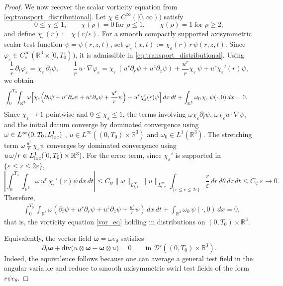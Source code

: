 \documentclass[reqno,11pt]{amsart}
\renewcommand{\div}{\mathrm{div}}
\begin{document}
\begin{proof}
We now recover the scalar vorticity equation from \eqref{eq:transport_distributional}.
Let $\chi\in C^\infty([0,\infty))$ satisfy
\[
0\le \chi\le 1,\qquad
\chi(\rho)=0\ \text{for }\rho\le 1,\qquad
\chi(\rho)=1\ \text{for }\rho\ge 2,
\]
and define $\chi_\varepsilon(r):=\chi(r/\varepsilon)$.
For a smooth compactly supported axisymmetric scalar test function
$\psi=\psi(r,z,t)$, set
$ \varphi_\varepsilon(x,t):=\chi_\varepsilon(r)\,r\,\psi(r,z,t).$
Since $\varphi_\varepsilon\in C_c^\infty(\mathbb R^3\times[0,T_0))$, it is admissible in
\eqref{eq:transport_distributional}. Using
\[
\frac1r\,\partial_t \varphi_\varepsilon=\chi_\varepsilon\,\partial_t\psi,
\qquad
\frac1r\,u\cdot\nabla \varphi_\varepsilon
=
\chi_\varepsilon\,(u^r\partial_r\psi+u^z\partial_z\psi)
+\frac{u^r}{r}\chi_\varepsilon\,\psi
+u^r\chi_\varepsilon'(r)\psi,
\]
we obtain
\begin{align*}
&\int_0^{T_0}\!\!\int_{\mathbb R^3}
\omega
\Bigl[
\chi_\varepsilon\Bigl(\partial_t\psi
+u^r\partial_r\psi
+u^z\partial_z\psi
+\frac{u^r}{r}\psi\Bigr)
+u^r\chi_\varepsilon'(r)\psi
\Bigr]\,dx\,dt
+\int_{\mathbb R^3}\omega_0\,\chi_\varepsilon\,\psi(\cdot,0)\,dx
=0.
\end{align*}
Since $\chi_\varepsilon\to 1$ pointwise and $0\le \chi_\varepsilon\le 1$,
the terms involving \(\omega\chi_\varepsilon\partial_t\psi\),
\(\omega\chi_\varepsilon u\cdot\nabla\psi\), and the initial datum converge by
dominated convergence using \(\omega\in L^\infty(0,T_0;L^1_{\rm loc})\) ,
\(u\in L^\infty((0,T_0)\times\mathbb R^3)\) and $\omega_0\in L^1(\mathbb{R}^3)$. The stretching term
$\omega\,\frac{u^r}{r}\,\chi_\varepsilon\psi$ 
converges by dominated convergence using
\(u\,\omega/r\in L^1_{\rm loc}([0,T_0)\times\mathbb R^3)\).
For the error term, since $\chi_\varepsilon'$ is supported in $\{\varepsilon\le r\le 2\varepsilon\}$,
\[
\left|
\int_0^{T_0}\!\!\int_{\mathbb R^3}\omega\,u^r\,\chi_\varepsilon'(r)\psi\,dx\,dt
\right|
\le C_{\psi}\|\omega\|_{L^\infty_{t,x}}\|u\|_{L^\infty_{t,x}}
\int_{\{\varepsilon\le r\le 2\varepsilon\}} \frac{r}{\varepsilon}\,dr\,d\theta\,dz\,dt
\le C_\psi \, \varepsilon\to 0.
\]
Therefore,
\begin{align*}
&\int_0^{T_0}\!\!\int_{\mathbb R^3}
\omega
\left(
\partial_t\psi
+u^r\partial_r\psi
+u^z\partial_z\psi
+\frac{u^r}{r}\psi
\right)\,dx\,dt
+\int_{\mathbb R^3}\omega_0\,\psi(\cdot,0)\,dx
=0,
\end{align*}
that is, the vorticity equation \eqref{vor_eq} holding in distributions on $(0,T_0)\times\mathbb R^3$.

Equivalently, the vector field $\boldsymbol{\omega}=\omega e_\theta$ satisfies
\[
\partial_t\boldsymbol{\omega}
+\div\bigl(u\otimes\boldsymbol{\omega}-\boldsymbol{\omega}\otimes u\bigr)=0
\qquad\text{in }\mathcal D'((0,T_0)\times\mathbb R^3).
\]
Indeed, the equivalence follows because one can average a general test field in the angular variable and reduce to smooth axisymmetric swirl test fields of the form $r\psi e_\theta$.


\end{proof}
\end{document}
